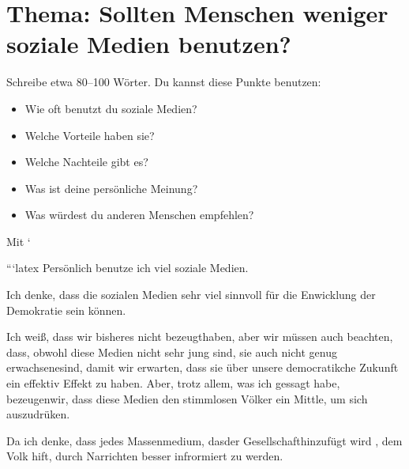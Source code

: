 \documentclass[a4paper]{article}
\title{}
\date{}
\author{Mohammad Rahmani}
\begin{document}
    \maketitle

    \section{Thema: Sollten Menschen weniger soziale Medien benutzen?}

        Schreibe etwa 80--100 Wörter. Du kannst diese Punkte benutzen:

        \begin{itemize}
            \item Wie oft benutzt du soziale Medien?
            \item Welche Vorteile haben sie?
            \item Welche Nachteile gibt es?
            \item Was ist deine persönliche Meinung?
            \item Was würdest du anderen Menschen empfehlen?
        \end{itemize}
        Mit `%

        ```latex
        Persönlich benutze ich viel soziale Medien.

        Ich denke, dass die sozialen Medien sehr viel sinnvoll für die Enwicklung der Demokratie sein können.

        Ich weiß, dass wir bisheres nicht bezeugthaben, aber wir müssen auch beachten, dass, obwohl diese Medien nicht sehr jung sind, sie auch nicht genug erwachsenesind, damit wir erwarten, dass sie über unsere democratikche Zukunft ein effektiv Effekt zu haben. Aber, trotz allem, was ich gessagt habe, bezeugenwir, dass diese Medien den stimmlosen Völker ein Mittle, um sich auszudrüken.

        Da ich denke, dass jedes Massenmedium, dasder Gesellschafthinzufügt wird , dem Volk hift, durch Narrichten besser infrormiert zu werden.
\end{document}
